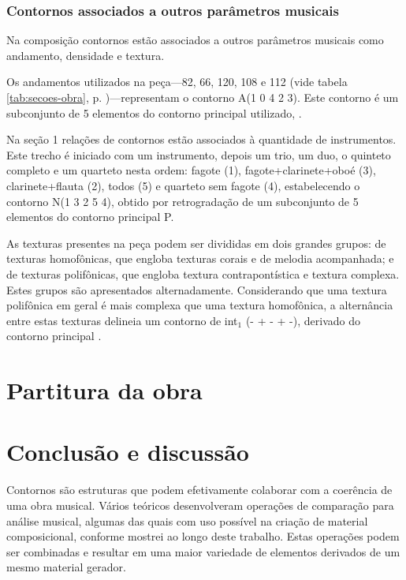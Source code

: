 \subsection{Contornos associados a outros parâmetros musicais}
\label{sec:cont-assoc-outr}

Na composição \obra{} contornos estão associados a outros parâmetros
musicais como andamento, densidade e textura.

Os andamentos utilizados na peça---82, 66, 120, 108 e 112 (vide tabela
\ref{tab:secoes-obra}, p. \pageref{tab:secoes-obra})---representam o
contorno A(1 0 4 2 3). Este contorno é um subconjunto de 5 elementos
do contorno principal utilizado, \contpr{}.

Na seção 1 relações de contornos estão associados à quantidade de
instrumentos. Este trecho é iniciado com um instrumento, depois um
trio, um duo, o quinteto completo e um quarteto nesta ordem: fagote
(1), fagote+clarinete+oboé (3), clarinete+flauta (2), todos (5) e
quarteto sem fagote (4), estabelecendo o contorno N(1 3 2 5 4), obtido
por retrogradação de um subconjunto de 5 elementos do contorno
principal P.

As texturas presentes na peça podem ser divididas em dois grandes
grupos: de texturas homofônicas, que engloba texturas corais e de
melodia acompanhada; e de texturas polifônicas, que engloba textura
contrapontística e textura complexa. Estes grupos são apresentados
alternadamente. Considerando que uma textura polifônica em geral é
mais complexa que uma textura homofônica, a alternância entre estas
texturas delineia um contorno de int$_1$ (- + - + -), derivado do
contorno principal \contpr{}.

\chapter{Partitura da obra \obra{}}
\label{cha:partitura-da-obra}



\chapter{Conclusão e discussão}
\label{cha:conclusao-e-discussao}

Contornos são estruturas que podem efetivamente colaborar com a
coerência de uma obra musical. Vários teóricos desenvolveram operações
de comparação para análise musical, algumas das quais com uso possível
na criação de material composicional, conforme mostrei ao longo deste
trabalho. Estas operações podem ser combinadas e resultar em uma maior
variedade de elementos derivados de um mesmo material gerador.

